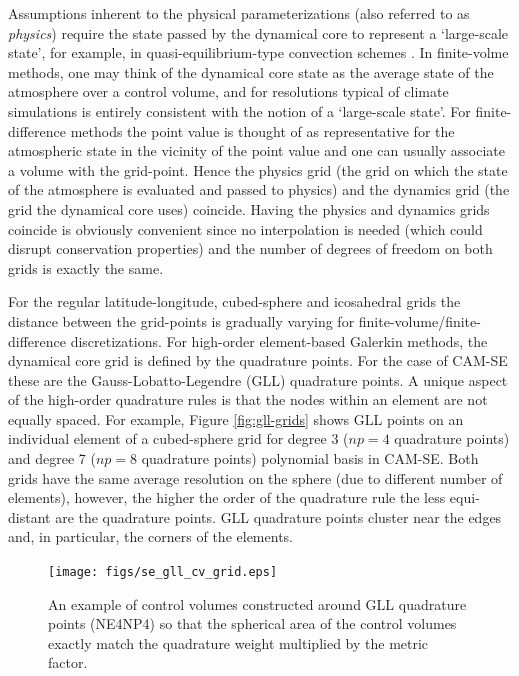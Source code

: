 \documentclass[twocol]{ametsoc}
\begin{document}
Assumptions inherent to the physical parameterizations (also referred to as {\em{physics}}) require the state passed by the dynamical core to represent a `large-scale state', for example, in quasi-equilibrium-type convection schemes \citep{AS1974JAS,PC2008JAS}. In finite-volme methods, one may think of the dynamical core state as the average state of the atmosphere over a control volume, and for resolutions typical of climate simulations is entirely consistent with the notion of a `large-scale state'. For finite-difference methods the point value is thought of as representative for the atmospheric state in the vicinity of the point value and one can usually associate a volume with the grid-point. Hence the physics grid (the grid on which the state of the atmosphere is evaluated and passed to physics) and the dynamics grid (the grid the dynamical core uses) coincide. Having the physics and dynamics grids coincide is obviously convenient since no interpolation is needed (which could disrupt conservation properties) and the number of degrees of freedom on both grids is exactly the same. 

For the regular latitude-longitude, cubed-sphere and icosahedral grids the distance between the grid-points is gradually varying for finite-volume/finite-difference discretizations. For high-order element-based Galerkin methods, the dynamical core grid is defined by the quadrature points. For the case of CAM-SE these are the Gauss-Lobatto-Legendre (GLL) quadrature points. A unique aspect of the high-order quadrature rules is that the nodes within an element are not equally spaced. For example, Figure \ref{fig:gll-grids} shows GLL points on an individual element of a cubed-sphere grid for degree 3 ($np=4$ quadrature points) and degree 7 ($np=8$ quadrature points) polynomial basis in CAM-SE. Both grids have the same average resolution on the sphere (due to different number of elements), however, the higher the order of the quadrature rule the less equi-distant are the quadrature points. GLL quadrature points cluster near the edges and, in particular, the corners of the elements.

\begin{figure}[t]
\noindent\texttt{[image: figs/se\_gll\_cv\_grid.eps]}\\
\caption{An example of control volumes constructed around GLL quadrature points (NE4NP4) so that the spherical area of the control volumes exactly match the quadrature weight multiplied by the metric factor.}
\label{fig:cv-grids}
\end{figure}
\end{document}
